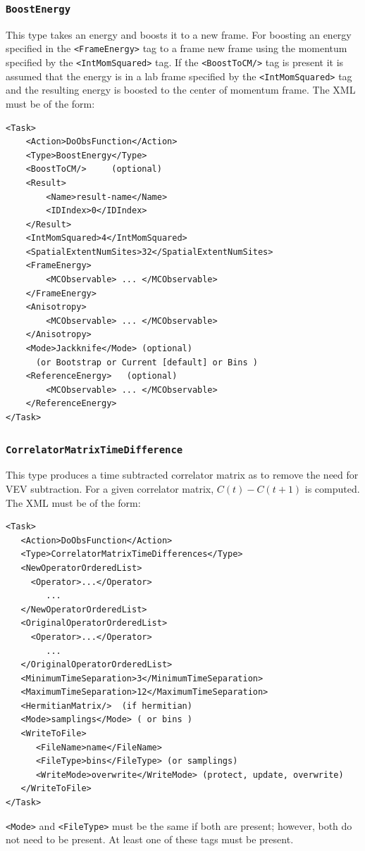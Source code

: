\documentclass[12pt]{article}
\newcommand{\vb}{\texttt}
\begin{document}
\subsubsection{\vb{BoostEnergy}}
This type takes an energy and boosts it to a new frame.
For boosting an energy specified in the \vb{<FrameEnergy>} tag
to a frame new frame using the momentum specified by the
\vb{<IntMomSquared>} tag. If the \vb{<BoostToCM/>} tag is present
it is assumed that the energy is in a lab frame specified by the
\vb{<IntMomSquared>} tag and the resulting energy is boosted to the
center of momentum frame.
The XML must be of the form:
\begin{verbatim}
<Task>
    <Action>DoObsFunction</Action>
    <Type>BoostEnergy</Type>
    <BoostToCM/>     (optional)
    <Result>
        <Name>result-name</Name>
        <IDIndex>0</IDIndex>
    </Result>
    <IntMomSquared>4</IntMomSquared>
    <SpatialExtentNumSites>32</SpatialExtentNumSites>
    <FrameEnergy>
        <MCObservable> ... </MCObservable>
    </FrameEnergy>
    <Anisotropy>
        <MCObservable> ... </MCObservable>
    </Anisotropy>
    <Mode>Jackknife</Mode> (optional)
      (or Bootstrap or Current [default] or Bins )
    <ReferenceEnergy>   (optional)
        <MCObservable> ... </MCObservable>
    </ReferenceEnergy>
</Task>
\end{verbatim}
\subsubsection{\vb{CorrelatorMatrixTimeDifference}}
This type produces a time subtracted
correlator matrix as to remove the need for VEV subtraction. For a given correlator
matrix, $C(t)-C(t+1)$ is computed.
The XML must be of the form:
\begin{verbatim}
<Task>
   <Action>DoObsFunction</Action>
   <Type>CorrelatorMatrixTimeDifferences</Type>
   <NewOperatorOrderedList>
     <Operator>...</Operator>
        ...
   </NewOperatorOrderedList>
   <OriginalOperatorOrderedList>
     <Operator>...</Operator>
        ...
   </OriginalOperatorOrderedList>
   <MinimumTimeSeparation>3</MinimumTimeSeparation>
   <MaximumTimeSeparation>12</MaximumTimeSeparation>
   <HermitianMatrix/>  (if hermitian)
   <Mode>samplings</Mode> ( or bins )
   <WriteToFile>
      <FileName>name</FileName>
      <FileType>bins</FileType> (or samplings)
      <WriteMode>overwrite</WriteMode> (protect, update, overwrite)
   </WriteToFile>
</Task>
\end{verbatim}
\vb{<Mode>} and \vb{<FileType>} must be the same if both are present;
however, both do not need to be present.  At least one of these tags must 
be present.
\end{document}
